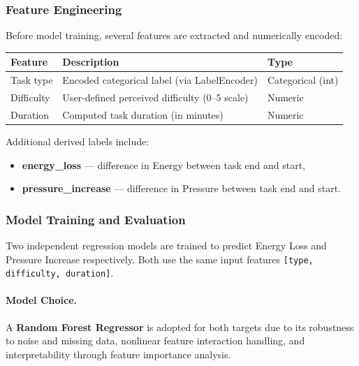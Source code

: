 \documentclass[12pt, a4paper]{article}
\begin{document}
        \subsubsection{Feature Engineering}
    
            Before model training, several features are extracted and numerically encoded:
    
            \begin{center}
                \begin{tabular}{l l l}
                    \toprule
                    \textbf{Feature} & \textbf{Description} & \textbf{Type} \\ \midrule   
                    Task type & Encoded categorical label (via LabelEncoder) & Categorical (int) \\
                    Difficulty & User-defined perceived difficulty (0–5 scale) & Numeric \\
                    Duration & Computed task duration (in minutes) & Numeric \\ \bottomrule
                \end{tabular}
            \end{center}
    
            Additional derived labels include:
            \begin{itemize}
                \item \textbf{energy\_loss} — difference in Energy between task end and start,
                \item \textbf{pressure\_increase} — difference in Pressure between task end and start.
            \end{itemize}
    
        \subsubsection{Model Training and Evaluation}
    
            Two independent regression models are trained to predict Energy Loss and Pressure Increase respectively. Both use the same input features \texttt{[type, difficulty, duration]}.
    
            \paragraph{Model Choice.}
            A \textbf{Random Forest Regressor} is adopted for both targets due to its robustness to noise and missing data, nonlinear feature interaction handling, and interpretability through feature importance analysis.
    
\end{document}
